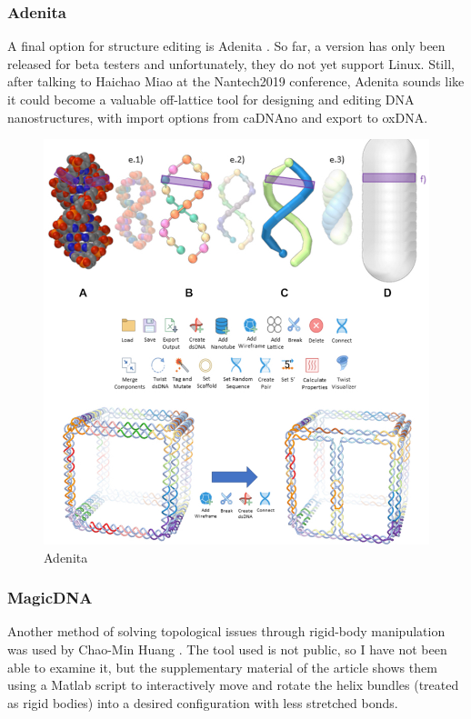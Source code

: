 \subsubsection{Adenita}
A final option for structure editing is Adenita \cite{miao_tvcg_2018}. So far, a version has only been released for beta testers and unfortunately, they do not yet support Linux. Still, after talking to Haichao Miao at the Nantech2019 conference, Adenita sounds like it could become a valuable off-lattice tool for designing and editing DNA nanostructures, with import options from caDNAno and export to oxDNA.


\begin{figure}[h]
  \begin{center}
    \includegraphics[width=\textwidth]{figures/adenita.jpg}
    \caption{Adenita}
    \label{fig:adenita}
  \end{center}
\end{figure}

\subsubsection{MagicDNA}
Another method of solving topological issues through rigid-body manipulation was used by Chao-Min Huang \cite{huang2019uncertainty}. The tool used is not public, so I have not been able to examine it, but the supplementary material of the article shows them using a Matlab script to interactively move and rotate the helix bundles (treated as rigid bodies) into a desired configuration with less stretched bonds.

